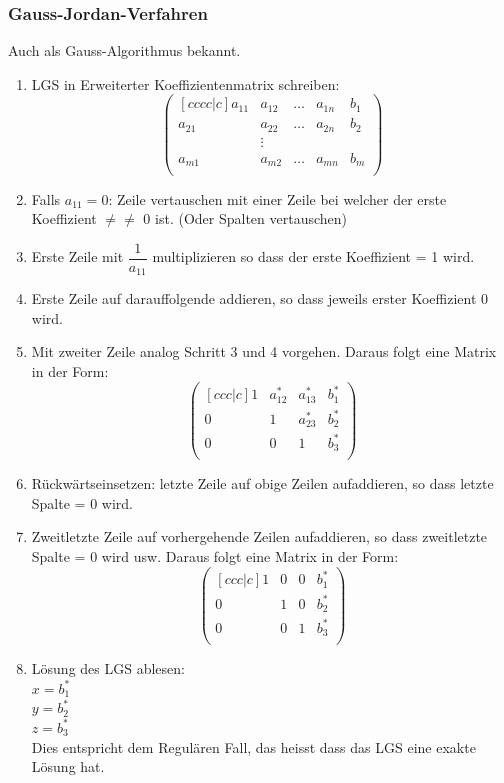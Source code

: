 \documentclass[10pt]{scrartcl}
\begin{document}
\begin{multicols}{2}
\subsubsection*{Gauss-Jordan-Verfahren}
\par
Auch als Gauss-Algorithmus bekannt.
\begin{enumerate}
\item LGS in Erweiterter Koeffizientenmatrix schreiben: \begin{equation}
\begin{pmatrix}[cccc|c]
a_{11} & a_{12} & \dots & a_{1n} & b_{1} \\
a_{21} & a_{22} & \dots & a_{2n} & b_{2} \\
& \vdots & & &\\
a_{m1} & a_{m2} & \dots & a_{mn} & b_{m} \\
\end{pmatrix}
\end{equation}
\item Falls $a_{11} = 0$: Zeile vertauschen mit einer Zeile bei welcher der erste Koeffizient $\neq\neq$ 0 ist. (Oder Spalten vertauschen)
\item Erste Zeile mit $\dfrac{1}{a_{11}}$ multiplizieren so dass der erste Koeffizient = 1 wird.
\item Erste Zeile auf darauffolgende addieren, so dass jeweils erster Koeffizient 0 wird.
\item Mit zweiter Zeile analog Schritt 3 und 4 vorgehen. Daraus folgt eine Matrix in der Form:\begin{equation}
\begin{pmatrix}[ccc|c]
1 & a_{12}^{*} & a_{13}^{*} & b_{1}^{*} \\
0 & 1 & a_{23}^{*} & b_{2}^{*} \\
0 & 0 & 1 & b_{3}^{*} \\
\end{pmatrix}
\end{equation} 
\item Rückwärtseinsetzen: letzte Zeile auf obige Zeilen aufaddieren, so dass letzte Spalte = 0 wird.
\item Zweitletzte Zeile auf vorhergehende Zeilen aufaddieren, so dass zweitletzte Spalte = 0 wird usw. Daraus folgt eine Matrix in der Form:\begin{equation}
\begin{pmatrix}[ccc|c]
1 & 0 & 0 & b_{1}^{*} \\
0 & 1 & 0 & b_{2}^{*} \\
0 & 0 & 1 & b_{3}^{*} \\
\end{pmatrix}
\end{equation}
\item Lösung des LGS ablesen:\\  $x = b_{1}^{*}$ \\ $y = b_{2}^{*}$ \\ $z = b_{3}^{*}$\\ Dies entspricht dem Regulären Fall, das heisst dass das LGS eine exakte Lösung hat.
\end{enumerate}

\end{multicols}
\end{document}
